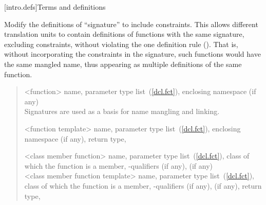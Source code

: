 [intro.defs]{Terms and definitions}

Modify the definitions of ``signature'' to include constraints. This allows 
different translation units to contain definitions of functions with the same 
signature, excluding constraints, without violating the one definition rule 
(). That is, without incorporating the constraints
in the signature, such functions would have the same mangled name, thus
appearing as multiple definitions of the same function.

\begin{quote}
%
<function> name, parameter type list~(\ref{dcl.fct}),  enclosing 
namespace (if any)%
\\
\enternote Signatures are used as a basis for
name mangling and linking.\exitnote

%
<function template> name, parameter type list~(\ref{dcl.fct}), enclosing namespace (if any),
return type,

%
<class member function> name, parameter type list~(\ref{dcl.fct}), class of which the
function is a member, \cv-qualifiers (if any),
  (if any)%
\\

%
<class member function template> name, parameter type list~(\ref{dcl.fct}), class of which the
function is a member, \cv-qualifiers (if any),
 (if any), return type,
\end{quote}
